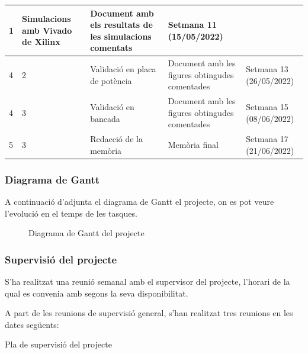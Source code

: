 {{\begin{table}[!htb]
\begin{supertabular}{|m{1.1cm}|m{1.8cm}|m{4.3cm}|m{4.3cm}|m{2.4cm}|}
                    { 1 } & 
                    { Simulacions amb Vivado de Xilinx } & 
                    { Document amb els resultats de les simulacions comentats } & 
                    { Setmana 11 (15/05/2022) } \\
                \hline
                    { 4 } & 
                    { 2 } & 
                    { Validació en placa de potència } & 
                    { Document amb les figures obtingudes comentades } & 
                    { Setmana 13 (26/05/2022) } \\
                \hline
                    { 4 } & 
                    { 3 } & 
                    { Validació en bancada } & 
                    { Document amb les figures obtingudes comentades } & 
                    { Setmana 15 (08/06/2022) } \\
                \hline
                    { 5 } & 
                    { 3 } & 
                    { Redacció de la memòria } & 
                    { Memòria final } & 
                    { Setmana 17 (21/06/2022) } \\
                \hline
            \end{supertabular}
        \end{table}
    }

    \subsubsection { Diagrama de Gantt }
    {
        A continuació d'adjunta el diagrama de Gantt el projecte, on es pot
        veure l'evolució en el temps de les tasques. \clearpage

        \begin{figure}[!htb]
            \centering
            
            \caption{ Diagrama de Gantt del projecte }
        \end{figure}
    }

    \subsubsection { Supervisió del projecte }
    {
        S'ha realitzat una reunió semanal amb el supervisor del projecte,
        l'horari de la qual es convenia amb segons la seva disponibilitat.

        A part de les reunions de supervisió general, s'han realitzat tres
        reunions en les dates següents:

        \begin{table}[!htb]
            \caption{ Pla de supervisió del projecte }
            \centering
            \tablefirsthead{}
            \tablehead{}
            \tabletail{}
            \tablelasttail{}


\end{table}}}
